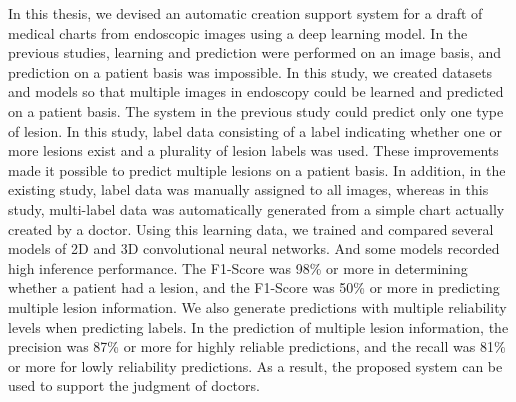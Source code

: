 In this thesis, we devised an automatic creation support system for a draft of medical charts from endoscopic images using a deep learning model.
In the previous studies, learning and prediction were performed on an image basis, and prediction on a patient basis was impossible.
In this study, we created datasets and models so that multiple images in endoscopy could be learned and predicted on a patient basis.
The system in the previous study could predict only one type of lesion.
In this study, label data consisting of a label indicating whether one or more lesions exist and a plurality of lesion labels was used.
These improvements made it possible to predict multiple lesions on a patient basis.
In addition, in the existing study, label data was manually assigned to all images, whereas in this study, multi-label data was automatically generated from a simple chart actually created by a doctor.
Using this learning data, we trained and compared several models of 2D and 3D convolutional neural networks. 
And some models recorded high inference performance.
The F1-Score was 98\% or more in determining whether a patient had a lesion, and the F1-Score was 50\% or more in predicting multiple lesion information.
We also generate predictions with multiple reliability levels when predicting labels.
In the prediction of multiple lesion information, the precision was 87\% or more for highly reliable predictions, and the recall was 81\% or more for lowly reliability predictions.
As a result, the proposed system can be used to support the judgment of doctors.
